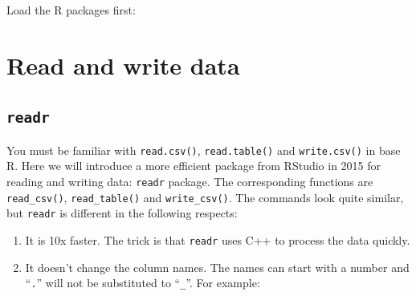 \documentclass[12pt,]{krantz}
\makeatletter
\newenvironment{Shaded}{\begin{snugshade}}{\end{snugshade}}
\newcommand{\CommentTok}[1]{\textcolor[rgb]{0.37,0.37,0.37}{\textit{#1}}}
\newcommand{\ControlFlowTok}[1]{\textcolor[rgb]{0.27,0.27,0.27}{\textbf{#1}}}
\newcommand{\DataTypeTok}[1]{\textcolor[rgb]{0.27,0.27,0.27}{#1}}
\newcommand{\DecValTok}[1]{\textcolor[rgb]{0.06,0.06,0.06}{#1}}
\newcommand{\KeywordTok}[1]{\textcolor[rgb]{0.27,0.27,0.27}{\textbf{#1}}}
\newcommand{\NormalTok}[1]{#1}
\newcommand{\OperatorTok}[1]{\textcolor[rgb]{0.43,0.43,0.43}{\textbf{#1}}}
\newcommand{\OtherTok}[1]{\textcolor[rgb]{0.37,0.37,0.37}{#1}}
\newcommand{\StringTok}[1]{\textcolor[rgb]{0.5,0.5,0.5}{#1}}
\newenvironment{kframe}{%
\medskip{}
\setlength{\fboxsep}{.8em}
 \def\at@end@of@kframe{}%
 \ifinner\ifhmode%
  \def\at@end@of@kframe{\end{minipage}}%
  \begin{minipage}{\columnwidth}%
 \fi\fi%
 \def\FrameCommand##1{\hskip\@totalleftmargin \hskip-\fboxsep
 \colorbox{shadecolor}{##1}\hskip-\fboxsep
     \hskip-\linewidth \hskip-\@totalleftmargin \hskip\columnwidth}%
 \MakeFramed {\advance\hsize-\width
   \@totalleftmargin\z@ \linewidth\hsize
   \@setminipage}}%
 {\par\unskip\endMakeFramed%
 \at@end@of@kframe}
\renewenvironment{Shaded}{\begin{kframe}}{\end{kframe}}
\makeatother
\begin{document}
Load the R packages first:

\begin{Shaded}
\end{Shaded}

\hypertarget{read-and-write-data}{%
\section{Read and write data}\label{read-and-write-data}}

\hypertarget{readr}{%
\subsection{\texorpdfstring{\texttt{readr}}{readr}}\label{readr}}

You must be familiar with \texttt{read.csv()}, \texttt{read.table()} and \texttt{write.csv()} in base R. Here we will introduce a more efficient package from RStudio in 2015 for reading and writing data: \texttt{readr} package. The corresponding functions are \texttt{read\_csv()}, \texttt{read\_table()} and \texttt{write\_csv()}. The commands look quite similar, but \texttt{readr} is different in the following respects:

\begin{enumerate}
\def\labelenumi{\arabic{enumi}.}
\item
  It is 10x faster. The trick is that \texttt{readr} uses C++ to process the data quickly.
\item
  It doesn't change the column names. The names can start with a number and ``\texttt{.}'' will not be substituted to ``\texttt{\_}''. For example:
\end{enumerate}
\end{document}
